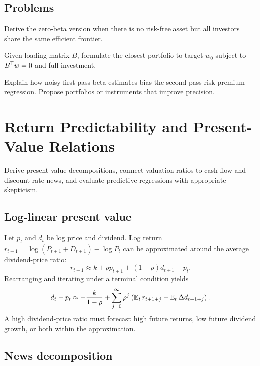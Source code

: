 \section{Problems}

\begin{exercise}
Derive the zero-beta version when there is no risk-free asset but all investors share
the same efficient frontier.
\end{exercise}
\begin{exercise}
Given loading matrix $B$, formulate the closest portfolio to target $w_0$ subject to
$B^\mathsf T w=0$ and full investment.
\end{exercise}
\begin{exercise}
Explain how noisy first-pass beta estimates bias the second-pass risk-premium
regression. Propose portfolios or instruments that improve precision.
\end{exercise}


\chapter{Return Predictability and Present-Value Relations}

\begin{objectives}
Derive present-value decompositions, connect valuation ratios to cash-flow and
discount-rate news, and evaluate predictive regressions with appropriate skepticism.
\end{objectives}

\section{Log-linear present value}

Let $p_t$ and $d_t$ be log price and dividend. Log return
$r_{t+1}=\log(P_{t+1}+D_{t+1})-\log P_t$ can be approximated around the average
dividend-price ratio:
\[
r_{t+1}\approx k+\rho p_{t+1}+(1-\rho)d_{t+1}-p_t.
\]
Rearranging and iterating under a terminal condition yields
\[
d_t-p_t
\approx -\frac{k}{1-\rho}
+\sum_{j=0}^{\infty}\rho^j
\left(\operatorname{\mathbb E}_t r_{t+1+j}-\operatorname{\mathbb E}_t\Delta d_{t+1+j}\right).
\]
A high dividend-price ratio must forecast high future returns, low future dividend
growth, or both within the approximation.

\section{News decomposition}

